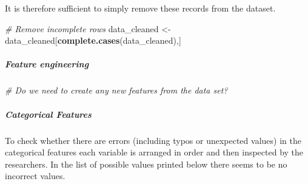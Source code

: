 \documentclass[12pt]{article}
\newenvironment{Shaded}{\begin{snugshade}}{\end{snugshade}}
\newcommand{\CommentTok}[1]{\textcolor[rgb]{0.56,0.35,0.01}{\textit{#1}}}
\newcommand{\KeywordTok}[1]{\textcolor[rgb]{0.13,0.29,0.53}{\textbf{#1}}}
\newcommand{\NormalTok}[1]{#1}
\newcommand{\StringTok}[1]{\textcolor[rgb]{0.31,0.60,0.02}{#1}}
\begin{document}
It is therefore sufficient to simply remove these records from the
dataset.

\begin{Shaded}
\begin{Highlighting}[]
\CommentTok{# Remove incomplete rows}
\NormalTok{data_cleaned <-}\StringTok{ }\NormalTok{data_cleaned[}\KeywordTok{complete.cases}\NormalTok{(data_cleaned),]}
\end{Highlighting}
\end{Shaded}

\hypertarget{feature-engineering}{%
\subparagraph{Feature engineering}\label{feature-engineering}}

\begin{Shaded}
\begin{Highlighting}[]
\CommentTok{# Do we need to create any new features from the data set?}
\end{Highlighting}
\end{Shaded}

\hypertarget{categorical-features}{%
\subparagraph{Categorical Features}\label{categorical-features}}

To check whether there are errors (including typos or unexpected values)
in the categorical features each variable is arranged in order and then
inspected by the researchers. In the list of possible values printed
below there seems to be no incorrect values.
\end{document}
